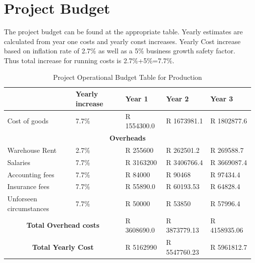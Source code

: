 \documentclass{article}
\begin{document}
  \section{Project Budget} \large
    The project budget can be found at the appropriate table. Yearly estimates are 
    calculated from year one costs and yearly const increases. 
    Yearly Cost increase based on inflation rate of 2.7\% as well as a 5\% business
    growth safety factor. Thus total increase for running costs is 2.7\%+5\%=7.7\%. 
  \begin{table}[H] \large
    \caption{Project Operational Budget Table for Production}
    \begin{tabular}{|l|l|l|l|l|}\hline
                      &Yearly increase & Year 1 & Year 2 & Year 3 \\ \hline 
        Cost of goods &7.7\%  & R 1554300.0 & R 1673981.1 & R 1802877.6 \\ \hline
        \hline
        \multicolumn{5}{|c|}{\textbf{Overheads}} \\ \hline
        Warehouse Rent &2.7\%            & R 255600    & R 262501.2    & R 269588.7  \\ \hline 
        Salaries & 7.7\%                 & R 3163200   & R 3406766.4   & R 3669087.4 \\ \hline
        Accounting fees & 7.7\%          & R 84000     & R 90468     & R 97434.4   \\ \hline 
        Insurance fees & 7.7\%           & R 55890.0   & R 60193.53   & R 64828.4  \\ \hline
        Unforseen circumstances & 7.7\%  & R 50000     & R 53850     & R 57996.4     \\ \hline
        \multicolumn{2}{|c|}{\textbf{Total Overhead costs}} & R 3608690.0 & R 3873779.13 & R 4158935.06 \\
        \hline 
        \hline 
        \multicolumn{2}{|c|}{\textbf{Total Yearly Cost}}    & R 5162990  & R 5547760.23 & R 5961812.7 \\ \hline
    \end{tabular}
  \end{table}
\end{document}
